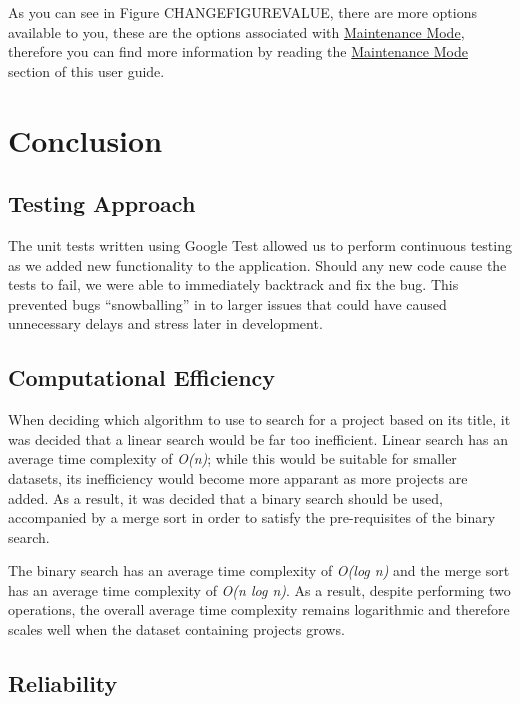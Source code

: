 \documentclass[
  english,
  a4paper,
,tablecaptionabove
]{scrartcl}
\begin{document}
As you can see in Figure CHANGEFIGUREVALUE, there are more options
available to you, these are the options associated with
\protect\hyperlink{using-maintenance-mode}{Maintenance Mode}, therefore
you can find more information by reading the
\protect\hyperlink{using-maintenance-mode}{Maintenance Mode} section of
this user guide.

\newpage

\hypertarget{conclusion}{%
\section{Conclusion}\label{conclusion}}

\hypertarget{testing-approach}{%
\subsection{Testing Approach}\label{testing-approach}}

The unit tests written using Google Test allowed us to perform
continuous testing as we added new functionality to the application.
Should any new code cause the tests to fail, we were able to immediately
backtrack and fix the bug. This prevented bugs \enquote{snowballing} in
to larger issues that could have caused unnecessary delays and stress
later in development.

\hypertarget{computational-efficiency}{%
\subsection{Computational Efficiency}\label{computational-efficiency}}

When deciding which algorithm to use to search for a project based on
its title, it was decided that a linear search would be far too
inefficient. Linear search has an average time complexity of
\emph{O(n)}; while this would be suitable for smaller datasets, its
inefficiency would become more apparant as more projects are added. As a
result, it was decided that a binary search should be used, accompanied
by a merge sort in order to satisfy the pre-requisites of the binary
search.

The binary search has an average time complexity of \emph{O(log n)} and
the merge sort has an average time complexity of \emph{O(n log n)}. As a
result, despite performing two operations, the overall average time
complexity remains logarithmic and therefore scales well when the
dataset containing projects grows.

\hypertarget{reliability}{%
\subsection{Reliability}\label{reliability}}
\end{document}
